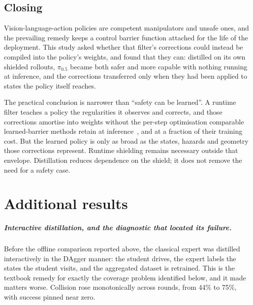 \documentclass[a4paper,11pt]{report}
\begin{document}
\section{Closing}\label{sec:conc:closing}

Vision-language-action policies are competent manipulators and unsafe ones, and the prevailing
remedy keeps a control barrier function attached for the life of the deployment. This study asked
whether that filter's corrections could instead be compiled into the policy's weights, and found
that they can: distilled on its own shielded rollouts, $\pi_{0.5}$ became both safer and more
capable with nothing running at inference, and the corrections transferred only when they had been
applied to states the policy itself reaches.

The practical conclusion is narrower than ``safety can be learned''. A runtime filter teaches a
policy the regularities it observes and corrects, and those corrections amortise into weights
without the per-step optimisation comparable learned-barrier methods retain at
inference~\cite{meng2024conbat,sun2025lpb}, and at a fraction of their training cost. But the
learned policy is only as broad as the states, hazards and geometry those corrections represent.
Runtime shielding remains necessary outside that envelope. Distillation reduces dependence on the
shield; it does not remove the need for a safety case.





\appendix
\chapter{Additional results}\label{app:dagger}

\paragraph{Interactive distillation, and the diagnostic that located its failure.}
Before the offline comparison reported above, the classical expert was distilled interactively in
the DAgger manner: the student drives, the expert labels the states the student visits, and the
aggregated dataset is retrained. This is the textbook remedy for exactly the coverage problem
identified below, and it made matters worse. Collision rose monotonically across rounds, from 44\%
to 75\%, with success pinned near zero.
\end{document}
